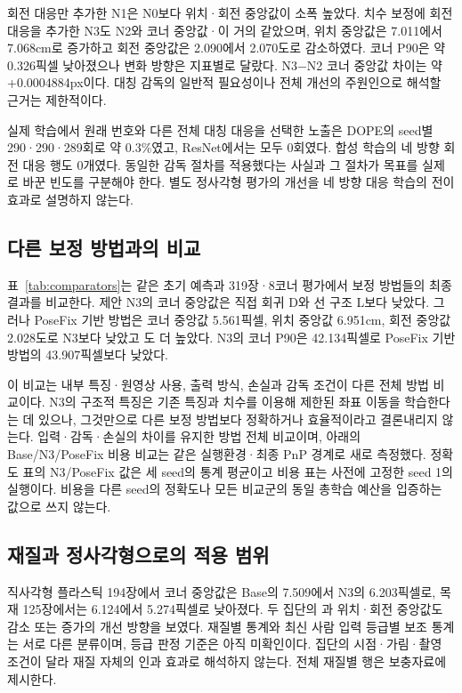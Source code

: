 회전 대응만 추가한 N1은 N0보다 위치·회전 중앙값이 소폭 높았다. 치수 보정에 회전 대응을 추가한 N3도 N2와 코너 중앙값·\pckten 이 거의 같았으며, 위치 중앙값은 7.011에서 7.068cm로 증가하고 회전 중앙값은 2.090에서 2.070도로 감소하였다. 코너 P90은 약 0.326픽셀 낮아졌으나 변화 방향은 지표별로 달랐다. N3−N2 코너 중앙값 차이는 약 +0.0004884px이다. 대칭 감독의 일반적 필요성이나 전체 개선의 주원인으로 해석할 근거는 제한적이다.

실제 학습에서 원래 번호와 다른 전체 대칭 대응을 선택한 노출은 DOPE의 seed별 290·290·289회로 약 0.3\%였고, ResNet에서는 모두 0회였다. 합성 학습의 네 방향 회전 대응 행도 0개였다. 동일한 감독 절차를 적용했다는 사실과 그 절차가 목표를 실제로 바꾼 빈도를 구분해야 한다. 별도 정사각형 평가의 개선을 네 방향 대응 학습의 전이 효과로 설명하지 않는다.

\subsection{다른 보정 방법과의 비교}
표~\ref{tab:comparators}는 같은 초기 예측과 319장·8코너 평가에서 보정 방법들의 최종 결과를 비교한다. 제안 N3의 코너 중앙값은 직접 회귀 D와 선 구조 L보다 낮았다. 그러나 PoseFix 기반 방법은 코너 중앙값 5.561픽셀, 위치 중앙값 6.951cm, 회전 중앙값 2.028도로 N3보다 낮았고 \pckten 도 더 높았다. N3의 코너 P90은 42.134픽셀로 PoseFix 기반 방법의 43.907픽셀보다 낮았다.


이 비교는 내부 특징·원영상 사용, 출력 방식, 손실과 감독 조건이 다른 전체 방법 비교이다. N3의 구조적 특징은 기존 특징과 치수를 이용해 제한된 좌표 이동을 학습한다는 데 있으나, 그것만으로 다른 보정 방법보다 정확하거나 효율적이라고 결론내리지 않는다. 입력·감독·손실의 차이를 유지한 방법 전체 비교이며, 아래의 Base/N3/PoseFix 비용 비교는 같은 실행환경·최종 PnP 경계로 새로 측정했다. 정확도 표의 N3/PoseFix 값은 세 seed의 통계 평균이고 비용 표는 사전에 고정한 seed 1의 실행이다. 비용을 다른 seed의 정확도나 모든 비교군의 동일 총학습 예산을 입증하는 값으로 쓰지 않는다.

\subsection{재질과 정사각형으로의 적용 범위}
직사각형 플라스틱 194장에서 코너 중앙값은 Base의 7.509에서 N3의 6.203픽셀로, 목재 125장에서는 6.124에서 5.274픽셀로 낮아졌다. 두 집단의 \pckten 과 위치·회전 중앙값도 감소 또는 증가의 개선 방향을 보였다. 재질별 통계와 최신 사람 입력 등급별 보조 통계는 서로 다른 분류이며, 등급 판정 기준은 아직 미확인이다. 집단의 시점·가림·촬영 조건이 달라 재질 자체의 인과 효과로 해석하지 않는다. 전체 재질별 행은 보충자료에 제시한다.

